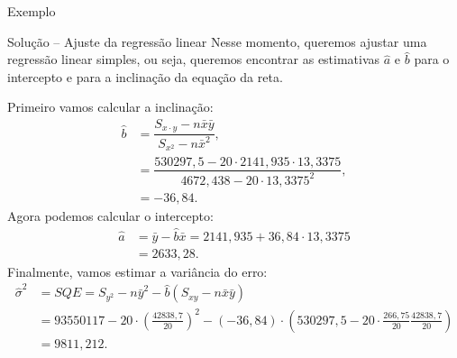 \documentclass[8pt]{beamer}
\begin{document}
\begin{frame}{Exemplo}
	
\small
	\begin{block}{Solução -- Ajuste da regressão linear}
		Nesse momento, queremos ajustar uma regressão linear simples, ou seja, queremos encontrar as estimativas $\hat{a}$ e $\hat{b}$ para o intercepto e para a inclinação da equação da reta.
		
		Primeiro vamos calcular a inclinação:
		\begin{align*}
		\hat{b} &= \dfrac{S_{x\cdot y} - n \bar{x} \bar{y}}{S_{x^2} - n \bar{x}^2},\\
		&= \dfrac{530297,5 - 20 \cdot 2141,935 \cdot 13,3375}{4672,438 - 20\cdot 13,3375	^2},\\
		&= -36,84.
		\end{align*}
		Agora podemos calcular o intercepto:
		\begin{align*}
		\hat{a} &= \bar{y} - \hat{b}\bar{x} = 2141,935	+ 36,84\cdot 13,3375\\
		&= 2633,28.
		\end{align*}		
		Finalmente, vamos estimar a variância do erro:
		\begin{align*}
		\hat{\sigma}^2 &= SQE = S_{y^2} - n \bar{y}^2 - \hat{b}(S_{xy} - n \bar{x} \bar{y}) \\
		&= 93550117 - 20 \cdot \left(\frac{42838,7}{20}\right)^2 - (-36,84)\cdot \left(530297,5 - 20 \cdot \frac{266,75}{20} \frac{42838,7}{20}\right)\\
		&= 9811,212.
		\end{align*}
	\end{block}
\normalsize
	
\end{frame}
\end{document}
